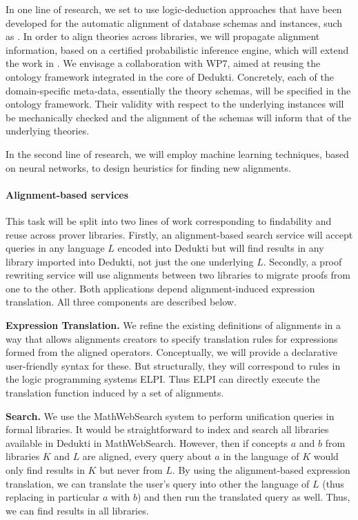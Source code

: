 In one line of research, we set to use logic-deduction approaches that
have been developed for the automatic alignment of database schemas
and instances, such as \cite{}.  In order to align theories across
libraries, we will propagate alignment information, based on a
certified probabilistic inference engine, which will extend the work
in \cite{}. We envisage a collaboration with WP7, aimed at reusing the
ontology framework integrated in the core of Dedukti. Concretely, each
of the domain-specific meta-data, essentially the theory schemas, will
be specified in the ontology framework. Their validity with respect to
the underlying instances will be mechanically checked and the
alignment of the schemas will inform that of the underlying theories.

In the second line of research, we will employ machine learning
techniques, based on neural networks, to design heuristics for finding
new alignments.

\paragraph{Alignment-based services}

This task will be split into two lines of work corresponding to findability and reuse across prover libraries.
Firstly, an alignment-based search service will accept queries in any language $L$ encoded into Dedukti but will find results in any library imported into Dedukti, not just the one underlying $L$.
Secondly, a proof rewriting service will use alignments between two libraries to migrate proofs from one to the other.
Both applications depend alignment-induced expression translation.
All three components are described below.

\textbf{Expression Translation.}
We refine the existing definitions of alignments in a way that allows alignments creators to specify translation rules for expressions formed from the aligned operators.
Conceptually, we will provide a declarative user-friendly syntax for these.
But structurally, they will correspond to rules in the logic programming systems ELPI.
Thus ELPI can directly execute the translation function induced by a set of alignments.

\textbf{Search.}
We use the MathWebSearch system to perform unification queries in formal libraries.
It would be straightforward to index and search all libraries available in Dedukti in MathWebSearch.
However, then if concepts $a$ and $b$ from libraries $K$ and $L$ are aligned, every query about $a$ in the language of $K$ would only find results in $K$ but never from $L$.
By using the alignment-based expression translation, we can translate the user's query into other the language of $L$ (thus replacing in particular $a$ with $b$) and then run the translated query as well.
Thus, we can find results in all libraries.

